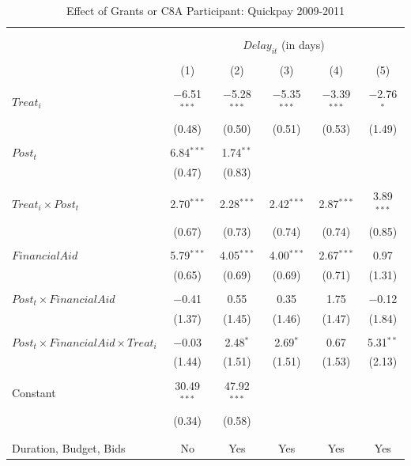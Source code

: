 \documentclass[
]{article}
\begin{document}
\begin{table}[H] \centering 
  \caption{Effect of Grants or C8A Participant: Quickpay 2009-2011} 
  \label{} 
\small 
\begin{tabular}{@{\extracolsep{-2pt}}lccccc} 
\\[-1.8ex]\hline 
\hline \\[-1.8ex] 
\\[-1.8ex] & \multicolumn{5}{c}{$Delay_{it}$ (in days)} \\ 
\\[-1.8ex] & (1) & (2) & (3) & (4) & (5)\\ 
\hline \\[-1.8ex] 
 $Treat_i$ & $-$6.51$^{***}$ & $-$5.28$^{***}$ & $-$5.35$^{***}$ & $-$3.39$^{***}$ & $-$2.76$^{*}$ \\ 
  & (0.48) & (0.50) & (0.51) & (0.53) & (1.49) \\ 
  & & & & & \\ 
 $Post_t$ & 6.84$^{***}$ & 1.74$^{**}$ &  &  &  \\ 
  & (0.47) & (0.83) &  &  &  \\ 
  & & & & & \\ 
 $Treat_i \times Post_t$ & 2.70$^{***}$ & 2.28$^{***}$ & 2.42$^{***}$ & 2.87$^{***}$ & 3.89$^{***}$ \\ 
  & (0.67) & (0.73) & (0.74) & (0.74) & (0.85) \\ 
  & & & & & \\ 
 $FinancialAid$ & 5.79$^{***}$ & 4.05$^{***}$ & 4.00$^{***}$ & 2.67$^{***}$ & 0.97 \\ 
  & (0.65) & (0.69) & (0.69) & (0.71) & (1.31) \\ 
  & & & & & \\ 
 $Post_t \times FinancialAid$ & $-$0.41 & 0.55 & 0.35 & 1.75 & $-$0.12 \\ 
  & (1.37) & (1.45) & (1.46) & (1.47) & (1.84) \\ 
  & & & & & \\ 
 $Post_t \times FinancialAid \times Treat_i$ & $-$0.03 & 2.48$^{*}$ & 2.69$^{*}$ & 0.67 & 5.31$^{**}$ \\ 
  & (1.44) & (1.51) & (1.51) & (1.53) & (2.13) \\ 
  & & & & & \\ 
 Constant & 30.49$^{***}$ & 47.92$^{***}$ &  &  &  \\ 
  & (0.34) & (0.58) &  &  &  \\ 
  & & & & & \\ 
\hline \\[-1.8ex] 
Duration, Budget, Bids & No & Yes & Yes & Yes & Yes \\ 

\end{tabular}
\end{table}
\end{document}
